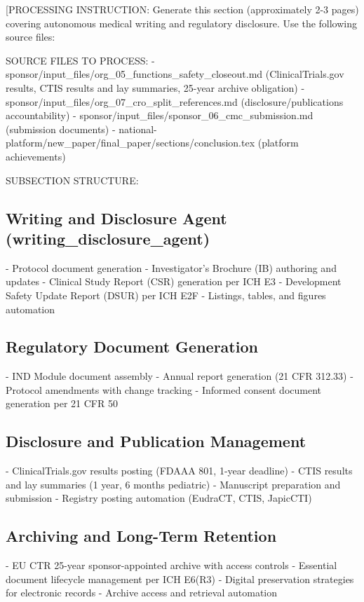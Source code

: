 
[PROCESSING INSTRUCTION: Generate this section (approximately 2-3 pages) covering autonomous
medical writing and regulatory disclosure. Use the following source files:

SOURCE FILES TO PROCESS:
- sponsor/input\_files/org\_05\_functions\_safety\_closeout.md (ClinicalTrials.gov results,
  CTIS results and lay summaries, 25-year archive obligation)
- sponsor/input\_files/org\_07\_cro\_split\_references.md (disclosure/publications accountability)
- sponsor/input\_files/sponsor\_06\_cmc\_submission.md (submission documents)
- national-platform/new\_paper/final\_paper/sections/conclusion.tex (platform achievements)

SUBSECTION STRUCTURE:

\subsection{Writing and Disclosure Agent (writing\_disclosure\_agent)}
- Protocol document generation
- Investigator's Brochure (IB) authoring and updates
- Clinical Study Report (CSR) generation per ICH E3
- Development Safety Update Report (DSUR) per ICH E2F
- Listings, tables, and figures automation

\subsection{Regulatory Document Generation}
- IND Module document assembly
- Annual report generation (21 CFR 312.33)
- Protocol amendments with change tracking
- Informed consent document generation per 21 CFR 50

\subsection{Disclosure and Publication Management}
- ClinicalTrials.gov results posting (FDAAA 801, 1-year deadline)
- CTIS results and lay summaries (1 year, 6 months pediatric)
- Manuscript preparation and submission
- Registry posting automation (EudraCT, CTIS, JapicCTI)

\subsection{Archiving and Long-Term Retention}
- EU CTR 25-year sponsor-appointed archive with access controls
- Essential document lifecycle management per ICH E6(R3)
- Digital preservation strategies for electronic records
- Archive access and retrieval automation

